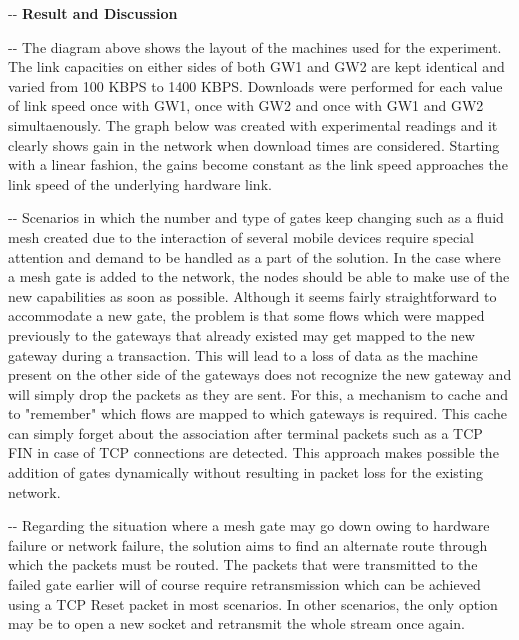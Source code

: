 \documentclass[12pt]{article}
\makeatletter
\newenvironment{indentation}[3]%
	{\par\setlength{\parindent}{#3}
	\setlength{\leftmargin}{#1}       \setlength{\rightmargin}{#1}%
	\advance\linewidth -\leftmargin       \advance\linewidth -\rightmargin%
	\advance\@totalleftmargin\leftmargin  \@setpar{{\@@par}}%
	\parshape 1\@totalleftmargin \linewidth\ignorespaces}{\par}%
\makeatother
\begin{document}
\begin{indentation}{0pt}{0pt}{0pt}
\textbf{{{\Large Result and Discussion}}}
\end{indentation}
\vspace{0.5cm}

\begin{indentation}{0pt}{0pt}{0pt}
  {\normalsize \hspace{1cm} The diagram above shows the layout of the machines used for the experiment. The link capacities on either sides of both GW1 and GW2 are kept identical and varied from 100 KBPS to 1400 KBPS. Downloads were performed for each value of link speed once with GW1, once with GW2 and once with GW1 and GW2 simultaenously. The graph below was created with experimental readings and it clearly shows  gain in the network when download times are considered. Starting with a linear fashion, the gains become constant as the link speed approaches the link speed of the underlying hardware link.}
\end{indentation}

\begin{indentation}{0pt}{0pt}{0pt}
{\normalsize \hspace{1cm} Scenarios in which the number and type of gates keep changing such as a fluid mesh created due to the interaction of several mobile devices require special attention and demand to be handled as a part of the solution. In the case where a mesh gate is added to the network, the nodes should be able to make use of the new capabilities as soon as possible. Although it seems fairly straightforward to accommodate a new gate, the problem is that some flows which were mapped previously to the gateways that already existed may get mapped to the new gateway during a transaction. This will lead to a loss of data as the machine present on the other side of the gateways does not recognize the new gateway and will simply drop the packets as they are sent. For this, a mechanism to cache and to "remember" which flows are mapped to which gateways is required. This cache can simply forget about the association after terminal packets such as a TCP FIN in case of TCP connections are detected. This approach makes possible the addition of gates dynamically without resulting in packet loss for the existing network.}
\end{indentation}

\begin{indentation}{0pt}{0pt}{0pt}
{\normalsize \hspace{1cm} Regarding the situation where a mesh gate may go down owing to hardware failure or network failure, the solution aims to find an alternate route through which the packets must be routed. The packets that were transmitted to the failed gate earlier will of course require retransmission which can be achieved using a TCP Reset packet in most scenarios. In other scenarios, the only option may be to open a new socket and retransmit the whole stream once again.}
\end{indentation}
\end{document}
